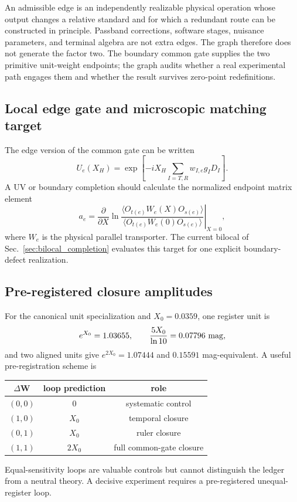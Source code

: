 \documentclass[aps,prd,twocolumn,10pt,superscriptaddress,nofootinbib]{revtex4-2}
\begin{document}
An admissible edge is an independently realizable physical operation whose
output changes a relative standard and for which a redundant route can be
constructed in principle.  Passband corrections, software stages, nuisance
parameters, and terminal algebra are not extra edges.  The graph therefore
does not generate the factor two.  The boundary common gate supplies the two
primitive unit-weight endpoints; the graph audits whether a real experimental
path engages them and whether the result survives zero-point redefinitions.

\subsection{Local edge gate and microscopic matching target}

The edge version of the common gate can be written
\begin{equation}
U_e(X_H)=\exp\!\left[-iX_H
\sum_{I=T,R}w_{I,e}g_I D_I\right].
\label{eq:pb_edge_gate}
\end{equation}
A UV or boundary completion should calculate the normalized endpoint matrix
element
\begin{equation}
a_e=
\left.\frac{\partial}{\partial X}
\ln\frac{\langle O_{t(e)}W_e(X)O_{s(e)}\rangle}
{\langle O_{t(e)}W_e(0)O_{s(e)}\rangle}
\right|_{X=0},
\label{eq:pb_matching_target}
\end{equation}
where $W_e$ is the physical parallel transporter.  The current bilocal of
Sec.~\ref{sec:bilocal_completion} evaluates this target for one explicit
boundary-defect realization.

\subsection{Pre-registered closure amplitudes}

For the canonical unit specialization and $X_0=0.0359$, one register unit is
\begin{equation}
e^{X_0}=1.03655,
\qquad
\frac{5X_0}{\ln10}=0.07796\ {\rm mag},
\label{eq:pb_unit_numbers}
\end{equation}
and two aligned units give $e^{2X_0}=1.07444$ and $0.15591$ mag-equivalent.
A useful pre-registration scheme is
\begin{center}
\begin{tabular}{ccc}
\toprule
$\Delta\mathbf W$ & loop prediction & role \\
\midrule
$(0,0)$ & $0$ & systematic control \\
$(1,0)$ & $X_0$ & temporal closure \\
$(0,1)$ & $X_0$ & ruler closure \\
$(1,1)$ & $2X_0$ & full common-gate closure \\
\bottomrule
\end{tabular}
\end{center}
Equal-sensitivity loops are valuable controls but cannot distinguish the
ledger from a neutral theory.  A decisive experiment requires a
pre-registered unequal-register loop.
\end{document}
